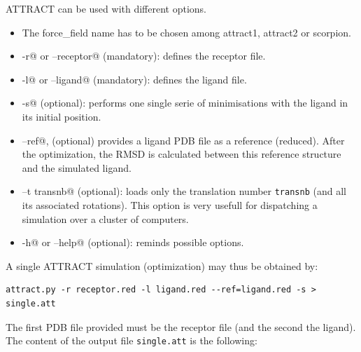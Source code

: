 \documentclass[12pt,a4paper]{article}
\begin{document}
ATTRACT can be used with different options.
\begin{itemize}
\item The force\_field name has to be chosen among attract1, attract2 or scorpion.
\item \verb@-r@ or \verb@--receptor@ (mandatory): defines the receptor file.
\item \verb@-l@ or \verb@--ligand@ (mandatory): defines the ligand file.
\item \verb@ -s@ (optional): performs one single serie of minimisations with the ligand in its initial position.
\item \verb@--ref@, (optional) provides a ligand PDB file as a reference (reduced). After the optimization, the RMSD is calculated between this reference structure and the simulated ligand.
\item \verb@--t transnb@ (optional): loads only the translation number {\tt transnb} (and all its associated rotations). This option is very usefull for dispatching a simulation over a cluster of computers.
\item \verb@-h@ or \verb@--help@ (optional): reminds possible options.
\end{itemize}

A single ATTRACT simulation (optimization) may thus be obtained by:
\begin{verbatim}
attract.py -r receptor.red -l ligand.red --ref=ligand.red -s > single.att
\end{verbatim}

The first PDB file provided must be the receptor file (and the second the ligand). The content of the output file {\tt single.att} is the following:
\end{document}
